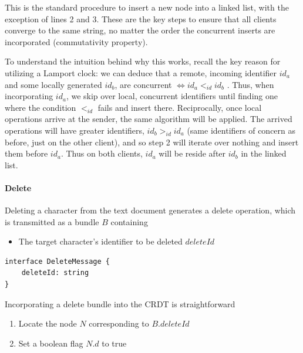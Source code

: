 \documentclass[12pt,a4paper,twoside,openright]{report}
\begin{document}
				This is the standard procedure to insert a new node into a linked list, with the exception of lines 2 and 3. These are the key steps to ensure that all clients converge to the same string, no matter the order the concurrent inserts are incorporated (commutativity property).
				
				To understand the intuition behind why this works, recall the key reason for utilizing a Lamport clock: we can deduce that a remote, incoming identifier $id_a$ and some locally generated $id_b$, are concurrent $\iff id_a <_{id} id_b$ . Thus, when incorporating $id_a$, we skip over local, concurrent identifiers until finding one where the condition $<_{id}$ fails and insert there. Reciprocally, once local operations arrive at the sender, the same algorithm will be applied. The arrived operations will have greater identifiers, $id_b >_{id} id_a$ (same identifiers of concern as before, just on the other client), and so step 2 will iterate over nothing and insert them before $id_a$. Thus on both clients, $id_a$ will be reside after $id_b$ in the linked list.
				
			\paragraph{Delete}
				Deleting a character from the text document generates a delete operation, which is transmitted as a bundle $B$ containing
				\begin{itemize}
					\item The target character's identifier to be deleted $deleteId$
				\end{itemize}
				
\vspace{3mm}
\begin{lstlisting}[caption=Delete Bundle Type Signature]
interface DeleteMessage {
    deleteId: string
}
\end{lstlisting}				
				
				Incorporating a delete bundle into the CRDT is straightforward
				\begin{enumerate}
					\item Locate the node $N$ corresponding to $B.deleteId$
					\item Set a boolean flag $N.d$ to true
				\end{enumerate}
				
\end{document}
